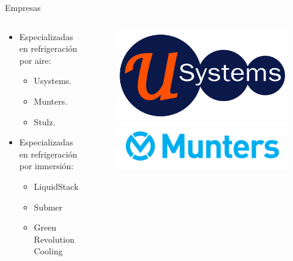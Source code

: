\documentclass[aspectratio=169, compress]{beamer}
\begin{document}
\begin{frame}{Empresas}
    \begin{columns}
        \begin{column}{0.5\textwidth}
            \begin{itemize}
                \item Especializadas en refrigeración por aire:
                \begin{itemize}
                    \item Usystems.
                    \item Munters.
                    \item Stulz.
                \end{itemize}

                \item Especializadas en refrigeración por inmersión:
                \begin{itemize}
                    \item LiquidStack
                    \item Submer
                    \item Green Revolution Cooling
                \end{itemize}
            \end{itemize}
        
            
        \end{column}
        \begin{column}{0.5\textwidth}
            \begin{figure}
                \begin{center}
                    \includegraphics[scale=0.15]{./figures/usystems}
                    \includegraphics[scale=0.2]{./figures/munters}


\end{center}
\end{figure}
\end{column}
\end{columns}
\end{frame}
\end{document}
